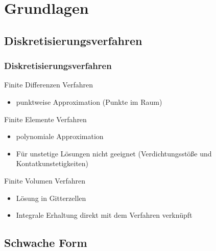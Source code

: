 \documentclass[
	11pt, %
	aspectratio=169, %
]{beamer}
\begin{document}
\section{Grundlagen} %

\subsection{Diskretisierungsverfahren}

\begin{frame}

	\frametitle{Diskretisierungsverfahren}
	
	Finite Differenzen Verfahren
	\begin{itemize}
		\item punktweise Approximation (Punkte im Raum)
	\end{itemize}
	\smallskip
	Finite Elemente Verfahren
	\begin{itemize}
		\item polynomiale Approximation
		\item Für unstetige Lösungen nicht geeignet (Verdichtungsstöße und Kontatkunstetigkeiten)
	\end{itemize}
	\smallskip
	Finite Volumen Verfahren
	\begin{itemize}
		\item Lösung in Gitterzellen
		\item Integrale Erhaltung direkt mit dem Verfahren verknüpft
	\end{itemize}

\end{frame}

\subsection{Schwache Form}
\end{document}
